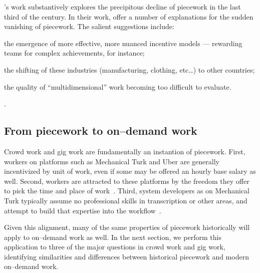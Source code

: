 \documentclass[trackingWork]{subfiles}
\begin{document}
\citeauthor{hart2013rise}'s work substantively explores the precipitous decline of piecework in the last third of the  century.
In their work, \citeauthor{hart2013rise} offer a number of explanations for the sudden vanishing of piecework.
The salient suggestions include:
\begin{inlinelist}
\item the emergence of more effective, more nuanced incentive models
--- rewarding teams for complex achievements, for instance;
\item the shifting of these industries (manufacturing, clothing, etc\dots)
to other countries;
\item the quality of ``multidimensional'' work becoming too difficult to evaluate.
\end{inlinelist}
\cite{hart2013rise}.



\subsection{From piecework to on--demand work}
Crowd work and gig work are fundamentally an instantion of piecework.
First, workers on platforms such as Mechanical Turk and Uber are generally incentivized by unit of work, even if some may be offered an hourly base salary as well.
Second, workers are attracted to these platforms by the freedom they offer to pick the time and place of work~\cite{martin2014being,whyWouldAnyoneBrewer}.
Third, system developers as on Mechanical Turk typically assume no professional skills in transcription or other areas, and attempt to build that expertise into the workflow~\cite{noronha2011platemate,bernsteinSoylent}.

Given this alignment, many of the same properties of piecework historically will apply to on--demand work as well. In the next section, we perform this application to three of the major questions in crowd work and gig work, identifying similarities and differences between historical piecework and modern on--demand work.

\onlyinsubfile{
  \printbibliography
  }
\end{document}
